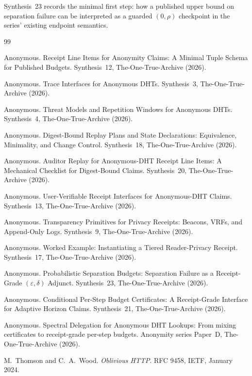 \documentclass[11pt]{article}
\begin{document}
Synthesis~23 records the minimal first step: how a published upper bound on separation failure can be interpreted as a guarded $(0,\rho)$ checkpoint in the series' existing endpoint semantics.\cite{series:probsep}

\begin{thebibliography}{99}\small

Anonymous.
\newblock Receipt Line Items for Anonymity Claims: A Minimal Tuple Schema for Published Budgets.
\newblock Synthesis~12, The-One-True-Archive (2026).

Anonymous.
\newblock Trace Interfaces for Anonymous DHTs.
\newblock Synthesis~3, The-One-True-Archive (2026).

Anonymous.
\newblock Threat Models and Repetition Windows for Anonymous DHTs.
\newblock Synthesis~4, The-One-True-Archive (2026).

Anonymous.
\newblock Digest-Bound Replay Plans and State Declarations: Equivalence, Minimality, and Change Control.
\newblock Synthesis~18, The-One-True-Archive (2026).

Anonymous.
\newblock Auditor Replay for Anonymous-DHT Receipt Line Items: A Mechanical Checklist for Digest-Bound Claims.
\newblock Synthesis~20, The-One-True-Archive (2026).

Anonymous.
\newblock User-Verifiable Receipt Interfaces for Anonymous-DHT Claims.
\newblock Synthesis~13, The-One-True-Archive (2026).

Anonymous.
\newblock Transparency Primitives for Privacy Receipts: Beacons, VRFs, and Append-Only Logs.
\newblock Synthesis~9, The-One-True-Archive (2026).

Anonymous.
\newblock Worked Example: Instantiating a Tiered Reader-Privacy Receipt.
\newblock Synthesis~17, The-One-True-Archive (2026).

Anonymous.
\newblock Probabilistic Separation Budgets: Separation Failure as a Receipt-Grade $(\varepsilon,\delta)$ Adjunct.
\newblock Synthesis~23, The-One-True-Archive (2026).

Anonymous.
\newblock Conditional Per-Step Budget Certificates: A Receipt-Grade Interface for Adaptive Horizon Claims.
\newblock Synthesis~21, The-One-True-Archive (2026).

Anonymous.
\newblock Spectral Delegation for Anonymous DHT Lookups: From mixing certificates to receipt-grade per-step budgets.
\newblock Anonymity series Paper~D, The-One-True-Archive (2026).

M.~Thomson and C.~A.~Wood.
\newblock \emph{Oblivious HTTP}.
\newblock RFC 9458, IETF, January 2024.

\end{thebibliography}
\end{document}
